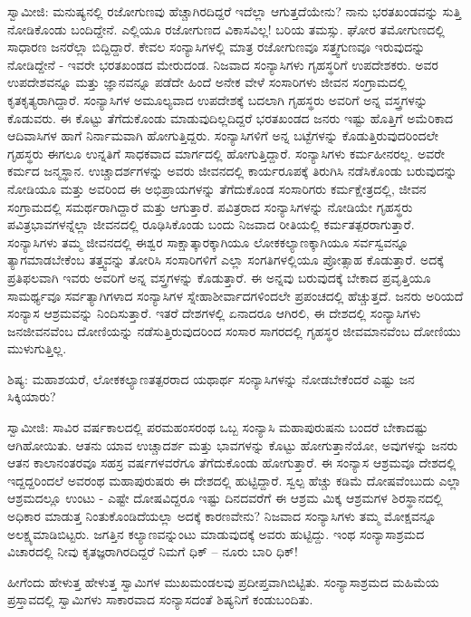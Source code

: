 ಸ್ವಾಮೀಜಿ: ಮನುಷ್ಯನಲ್ಲಿ ರಜೋಗುಣವು ಹೆಚ್ಚಾಗಿರದಿದ್ದರೆ ಇದೆಲ್ಲಾ ಆಗುತ್ತದೆಯೇನು? ನಾನು ಭರತಖಂಡವನ್ನು ಸುತ್ತಿ ನೋಡಿಕೊಂಡು ಬಂದಿದ್ದೇನೆ. ಎಲ್ಲಿಯೂ ರಜೋಗುಣದ ವಿಕಾಸವಿಲ್ಲ! ಬರಿಯ ತಮಸ್ಸು. ಘೋರ ತಮೋಗುಣದಲ್ಲಿ ಸಾಧಾರಣ ಜನರೆಲ್ಲಾ ಬಿದ್ದಿದ್ದಾರೆ. ಕೇವಲ ಸಂನ್ಯಾಸಿಗಳಲ್ಲಿ ಮಾತ್ರ ರಜೋಗುಣವೂ ಸತ್ತ್ವಗುಣವೂ ಇರುವುದನ್ನು ನೋಡಿದ್ದೇನೆ - ಇವರೇ ಭರತಖಂಡದ ಮೇರುದಂಡ. ನಿಜವಾದ ಸಂನ್ಯಾಸಿಗಳು ಗೃಹಸ್ಥರಿಗೆ ಉಪದೇಶಕರು. ಅವರ ಉಪದೇಶವನ್ನೂ ಮತ್ತು ಜ್ಞಾನವನ್ನೂ ಪಡೆದೇ ಹಿಂದೆ ಅನೇಕ ವೇಳೆ ಸಂಸಾರಿಗಳು ಜೀವನ ಸಂಗ್ರಾಮದಲ್ಲಿ ಕೃತಕೃತ್ಯರಾಗಿದ್ದಾರೆ. ಸಂನ್ಯಾಸಿಗಳ ಅಮೂಲ್ಯವಾದ ಉಪದೇಶಕ್ಕೆ ಬದಲಾಗಿ ಗೃಹಸ್ಥರು ಅವರಿಗೆ ಅನ್ನ ವಸ್ತ್ರಗಳನ್ನು ಕೊಡುವರು. ಈ ಕೊಟ್ಟು ತೆಗೆದುಕೊಂಡು ಮಾಡುವುದಿಲ್ಲದಿದ್ದರೆ ಭರತಖಂಡದ ಜನರು ಇಷ್ಟು ಹೊತ್ತಿಗೆ ಅಮೆರಿಕಾದ ಆದಿವಾಸಿಗಳ ಹಾಗೆ ನಿರ್ನಾಮವಾಗಿ ಹೋಗುತ್ತಿದ್ದರು. ಸಂನ್ಯಾಸಿಗಳಿಗೆ ಅನ್ನ ಬಟ್ಟೆಗಳನ್ನು ಕೊಡುತ್ತಿರುವುದರಿಂದಲೇ ಗೃಹಸ್ಥರು ಈಗಲೂ ಉನ್ನತಿಗೆ ಸಾಧಕವಾದ ಮಾರ್ಗದಲ್ಲಿ ಹೋಗುತ್ತಿದ್ದಾರೆ. ಸಂನ್ಯಾಸಿಗಳು ಕರ್ಮಹೀನರಲ್ಲ. ಅವರೇ ಕರ್ಮದ ಜನ್ಮಸ್ಥಾನ. ಉಚ್ಚಾದರ್ಶಗಳನ್ನು ಅವರು ಜೀವನದಲ್ಲಿ ಕಾರ್ಯರೂಪಕ್ಕೆ ತಿರುಗಿಸಿ ನಡೆಸಿಕೊಂಡು ಬರುವುದನ್ನು ನೋಡಿಯೂ ಮತ್ತು ಅವರಿಂದ ಈ ಅಭಿಪ್ರಾಯಗಳನ್ನು ತೆಗೆದುಕೊಂಡ ಸಂಸಾರಿಗರು ಕರ್ಮಕ್ಷೇತ್ರದಲ್ಲಿ, ಜೀವನ ಸಂಗ್ರಾಮದಲ್ಲಿ ಸಮರ್ಥರಾಗಿದ್ದಾರೆ ಮತ್ತು ಆಗುತ್ತಾರೆ. ಪವಿತ್ರರಾದ ಸಂನ್ಯಾಸಿಗಳನ್ನು ನೋಡಿಯೇ ಗೃಹಸ್ಥರು ಪವಿತ್ರಭಾವಗಳನ್ನೆಲ್ಲಾ ಜೀವನದಲ್ಲಿ ರೂಢಿಸಿಕೊಂಡು ಬಂದು ನಿಜವಾದ ರೀತಿಯಲ್ಲಿ ಕರ್ಮತತ್ಪರರಾಗುತ್ತಾರೆ. ಸಂನ್ಯಾಸಿಗಳು ತಮ್ಮ ಜೀವನದಲ್ಲಿ ಈಶ್ವರ ಸಾಕ್ಷಾತ್ಕಾರಕ್ಕಾಗಿಯೂ ಲೋಕಕಲ್ಯಾಣಕ್ಕಾಗಿಯೂ ಸರ್ವಸ್ವವನ್ನೂ ತ್ಯಾಗಮಾಡಬೇಕೆಂಬ ತತ್ತ್ವವನ್ನು ತೋರಿಸಿ ಸಂಸಾರಿಗಳಿಗೆ ಎಲ್ಲಾ ಸಂಗತಿಗಳಲ್ಲಿಯೂ ಪ್ರೋತ್ಸಾಹ ಕೊಡುತ್ತಾರೆ. ಅದಕ್ಕೆ ಪ್ರತಿಫಲವಾಗಿ ಇವರು ಅವರಿಗೆ ಅನ್ನ ವಸ್ತ್ರಗಳನ್ನು ಕೊಡುತ್ತಾರೆ. ಈ ಅನ್ನವು ಬರುವುದಕ್ಕೆ ಬೇಕಾದ ಪ್ರವೃತ್ತಿಯೂ ಸಾಮರ್ಥ್ಯವೂ ಸರ್ವತ್ಯಾಗಿಗಳಾದ ಸಂನ್ಯಾಸಿಗಳ ಸ್ನೇಹಾಶೀರ್ವಾದಗಳಿಂದಲೇ ಪ್ರಪಂಚದಲ್ಲಿ ಹೆಚ್ಚುತ್ತದೆ. ಜನರು ಅರಿಯದೆ ಸಂನ್ಯಾಸ ಆಶ್ರಮವನ್ನು ನಿಂದಿಸುತ್ತಾರೆ. ಇತರೆ ದೇಶಗಳಲ್ಲಿ ಏನಾದರೂ ಆಗಿರಲಿ, ಈ ದೇಶದಲ್ಲಿ ಸಂನ್ಯಾಸಿಗಳು ಜನಜೀವನವೆಂಬ ದೋಣಿಯನ್ನು ನಡೆಸುತ್ತಿರುವುದರಿಂದ ಸಂಸಾರ ಸಾಗರದಲ್ಲಿ ಗೃಹಸ್ಥರ ಜೀವಮಾನವೆಂಬ ದೋಣಿಯು ಮುಳುಗುತ್ತಿಲ್ಲ.

ಶಿಷ್ಯ: ಮಹಾಶಯರೆ, ಲೋಕಕಲ್ಯಾಣತತ್ಪರರಾದ ಯಥಾರ್ಥ ಸಂನ್ಯಾಸಿಗಳನ್ನು ನೋಡಬೇಕೆಂದರೆ ಎಷ್ಟು ಜನ ಸಿಕ್ಕಿಯಾರು?

ಸ್ವಾಮೀಜಿ: ಸಾವಿರ ವರ್ಷಕಾಲದಲ್ಲಿ ಪರಮಹಂಸರಂಥ ಒಬ್ಬ ಸಂನ್ಯಾಸಿ ಮಹಾಪುರುಷನು ಬಂದರೆ ಬೇಕಾದಷ್ಟು ಆಗಿಹೋಯಿತು. ಆತನು ಯಾವ ಉಚ್ಚಾದರ್ಶ ಮತ್ತು ಭಾವಗಳನ್ನು ಕೊಟ್ಟು ಹೋಗುತ್ತಾನೆಯೋ, ಅವುಗಳನ್ನು ಜನರು ಆತನ ಕಾಲಾನಂತರವೂ ಸಹಸ್ರ ವರ್ಷಗಳವರೆಗೂ ತೆಗೆದುಕೊಂಡು ಹೋಗುತ್ತಾರೆ. ಈ ಸಂನ್ಯಾಸ ಆಶ್ರಮವೂ ದೇಶದಲ್ಲಿ ಇದ್ದದ್ದರಿಂದಲೆ ಅವರಂಥ ಮಹಾಪುರುಷರು ಈ ದೇಶದಲ್ಲಿ ಹುಟ್ಟಿದ್ದಾರೆ. ಸ್ವಲ್ಪ ಹೆಚ್ಚು ಕಡಿಮೆ ದೋಷವೆಂಬುದು ಎಲ್ಲಾ ಆಶ್ರಮದಲ್ಲೂ ಉಂಟು - ಎಷ್ಟೇ ದೋಷವಿದ್ದರೂ ಇಷ್ಟು ದಿನದವರೆಗೆ ಈ ಆಶ್ರಮ ಮಿಕ್ಕ ಆಶ್ರಮಗಳ ಶಿರಸ್ಥಾನದಲ್ಲಿ ಅಧಿಕಾರ ಮಾಡುತ್ತ ನಿಂತುಕೊಂಡಿದೆಯಲ್ಲಾ ಅದಕ್ಕೆ ಕಾರಣವೇನು? ನಿಜವಾದ ಸಂನ್ಯಾಸಿಗಳು ತಮ್ಮ ಮೋಕ್ಷವನ್ನೂ ಅಲಕ್ಷ್ಯಮಾಡಿಬಿಟ್ಟರು. ಜಗತ್ತಿನ ಕಲ್ಯಾಣವನ್ನುಂಟು ಮಾಡುವುದಕ್ಕೆ ಅವರು ಹುಟ್ಟಿದ್ದು. ಇಂಥ ಸಂನ್ಯಾಸಾಶ್ರಮದ ವಿಚಾರದಲ್ಲಿ ನೀವು ಕೃತಜ್ಞರಾಗಿರದಿದ್ದರೆ ನಿಮಗೆ ಧಿಕ್ – ನೂರು ಬಾರಿ ಧಿಕ್!

ಹೀಗೆಂದು ಹೇಳುತ್ತ ಹೇಳುತ್ತ ಸ್ವಾಮಿಗಳ ಮುಖಮಂಡಲವು ಪ್ರದೀಪ್ತವಾಗಿಬಿಟ್ಟಿತು. ಸಂನ್ಯಾಸಾಶ್ರಮದ ಮಹಿಮೆಯ ಪ್ರಸ್ತಾವದಲ್ಲಿ ಸ್ವಾಮಿಗಳು ಸಾಕಾರವಾದ ಸಂನ್ಯಾಸದಂತೆ ಶಿಷ್ಯನಿಗೆ ಕಂಡುಬಂದಿತು.

